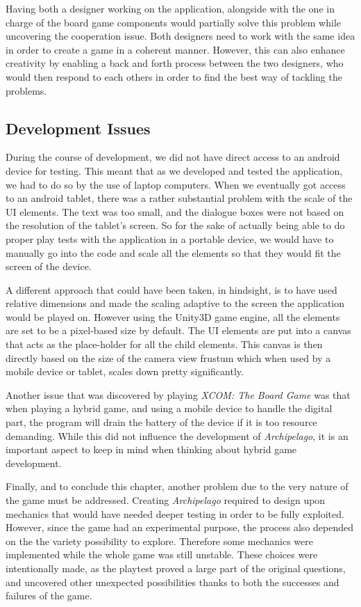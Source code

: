 Having both a designer working on the application, alongside with the one in charge of the board game components would partially solve this problem while uncovering the cooperation issue. Both designers need to work with the same idea in order to create a game in a coherent manner. However, this can also enhance creativity by enabling a back and forth process between the two designers, who would then respond to each others in order to find the best way of tackling the problems. 

\subsection{Development Issues}
During the course of development, we did not have direct access to an android device for testing. This meant that as we developed and tested the application, we had to do so by the use of laptop computers. When we eventually got access to an android tablet, there was a rather substantial problem with the scale of the UI elements. The text was too small, and the dialogue boxes were not based on the resolution of the tablet's screen. So for the sake of actually being able to do proper play tests with the application in a portable device, we would have to manually go into the code and scale all the elements so that they would fit the screen of the device. 

A different approach that could have been taken, in hindsight, is to have used relative dimensions and made the scaling adaptive to the screen the application would be played on. However using the Unity3D game engine, all the elements are set to be a pixel-based size by default. The UI elements are put into a canvas that acts as the place-holder for all the child elements. This canvas is then directly based on the size of the camera view frustum which when used by a mobile device or tablet, scales down pretty significantly. 

Another issue that was discovered by playing \textit{XCOM: The Board Game} \cite{game:xcomtbg} was that when playing a hybrid game, and using a mobile device to handle the digital part, the program will drain the battery of the device if it is too resource demanding. While this did not influence the development of \textit{Archipelago}, it is an important aspect to keep in mind when thinking about hybrid game development.

Finally, and to conclude this chapter, another problem due to the very nature of the game must be addressed. Creating \textit{Archipelago} required to design upon mechanics that would have needed deeper testing in order to be fully exploited. However, since the game had an experimental purpose, the process also depended on the the variety possibility to explore. Therefore some mechanics were implemented while the whole game was still unstable. These choices were intentionally made, as the playtest proved a large part of the original questions, and uncovered other unexpected possibilities thanks to both the successes and failures of the game. 